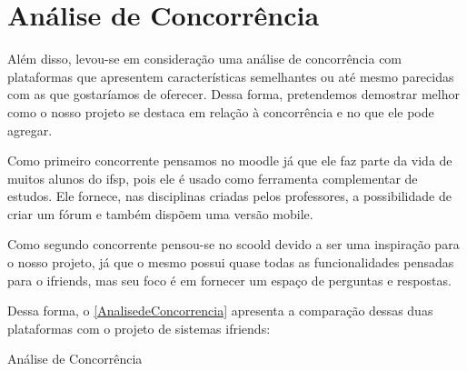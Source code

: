 
\section{Análise de Concorrência}
Além disso, levou-se em consideração uma análise de concorrência com plataformas que apresentem características semelhantes ou até mesmo parecidas com as que gostaríamos de oferecer. Dessa forma, pretendemos demostrar melhor como o nosso projeto se destaca em relação à concorrência e no que ele pode agregar.

Como primeiro concorrente pensamos no \gls{moodle} já que ele faz parte da vida de muitos alunos do \acs{ifsp}, pois ele é usado como ferramenta complementar de estudos. Ele fornece, nas disciplinas criadas pelos professores, a possibilidade de criar um fórum e também dispõem uma versão mobile.

Como segundo concorrente pensou-se no \gls{scoold} devido a ser uma inspiração para o nosso projeto, já que o mesmo possui quase todas as funcionalidades pensadas para o \gls{ifriends}, mas seu foco é em fornecer um espaço de perguntas e respostas. 

Dessa forma, o \autoref{AnalisedeConcorrencia} apresenta a comparação dessas duas plataformas com o projeto de sistemas \gls{ifriends}:

\def\arraystretch{2}
\begin{quadro}[htb]
\centering
\ABNTEXfontereduzida
\caption{Análise de Concorrência}
\label{AnalisedeConcorrencia}
\end{quadro}
\FloatBarrier

